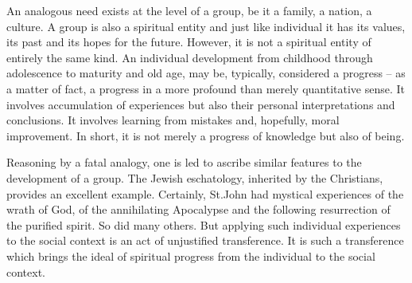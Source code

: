 An analogous need exists at the level of a group, be it a family, a nation,
a culture. A group is also a spiritual entity and just like individual it has
its values, its past and its hopes for the future. However, it is not a
spiritual entity of entirely the same kind. An individual 
development from childhood through adolescence to maturity and old age, may
be, typically, considered a progress -- as a matter of fact, a progress in a
more profound than merely quantitative sense. It involves accumulation of
experiences but also their personal interpretations and conclusions. It 
involves learning from mistakes and, hopefully, moral improvement. In short,
it is not merely a progress of knowledge but also of being. 

Reasoning by a 
fatal analogy, one is led to ascribe similar features to the development of 
a group.
The Jewish eschatology, inherited by the Christians,  provides an excellent 
example. Certainly,
St.John had mystical experiences of the wrath of God, of the annihilating
Apocalypse and the following resurrection of the purified spirit. So did many
others. But applying such individual experiences to the social context is an
act of unjustified transference. It is such a transference which brings the 
ideal of spiritual progress from the individual to the social context.


